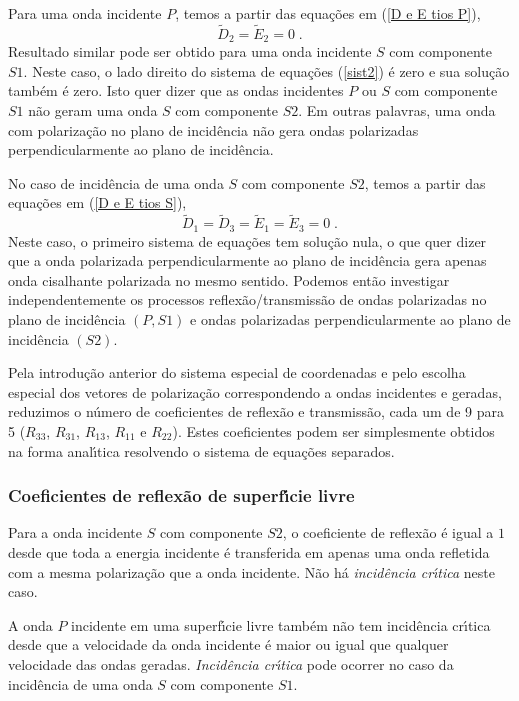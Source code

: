 Para uma onda incidente $P$, temos a partir das equa\c{c}\~oes em
(\ref{D e E tios P}),
\begin{equation}
\tilde{D}_2=\tilde{E}_2=0 \;.
\end{equation}
Resultado similar pode ser obtido para uma onda incidente $S$ com
componente $S1$. Neste caso, o lado direito do sistema de
equa\c{c}\~oes (\ref{sist2}) \'e zero e sua solu\c{c}\~ao tamb\'em
\'e zero. Isto quer dizer que as ondas incidentes $P$ ou $S$ com
componente $S1$ n\~ao geram uma onda $S$ com componente $S2$. Em
outras palavras, uma onda com polariza\c{c}\~ao no plano de
incid\^encia n\~ao gera ondas polarizadas perpendicularmente ao
plano de incid\^encia.

No caso de incid\^encia de uma onda $S$ com componente $S2$, temos
a partir das equa\c{c}\~oes em (\ref{D e E tios S}),
\begin{equation}
\tilde{D}_1=\tilde{D}_3=\tilde{E}_1=\tilde{E}_3=0 \;.
\end{equation}
Neste caso, o primeiro sistema de equa\c{c}\~oes tem solu\c{c}\~ao
nula, o que quer dizer que a onda polarizada perpendicularmente ao
plano de incid\^encia gera apenas onda cisalhante polarizada no
mesmo sentido. Podemos ent\~ao investigar independentemente os
processos reflex\~ao/transmiss\~ao de ondas polarizadas no plano
de incid\^encia $(P,S1)$ e ondas polarizadas perpendicularmente ao
plano de incid\^encia $(S2)$.

Pela introdu\c{c}\~ao anterior do sistema especial de coordenadas
e pelo escolha especial dos vetores de polariza\c{c}\~ao
correspondendo a ondas incidentes e geradas, reduzimos o n\'umero
de coeficientes de reflex\~ao e transmiss\~ao, cada um de 9 para 5
($R_{33}$, $R_{31}$, $R_{13}$, $R_{11}$ e $R_{22}$). Estes
coeficientes podem ser simplesmente obtidos na forma
anal\'{\i}tica resolvendo o sistema de equa\c{c}\~oes separados.


\subsubsection{Coeficientes de reflex\~ao de superf\'{\i}cie livre}

Para a onda incidente $S$ com componente $S2$, o coeficiente de
reflex\~ao \'e igual a $1$ desde que toda a energia incidente \'e
transferida em apenas uma onda refletida com a mesma
polariza\c{c}\~ao que a onda incidente. N\~ao h\'a {\it
incid\^encia cr\'{\i}tica} neste caso.

A onda $P$ incidente em uma superf\'{\i}cie livre tamb\'em n\~ao
tem incid\^encia cr\'{\i}tica desde que a velocidade da onda
incidente \'e maior ou igual que qualquer velocidade das ondas
geradas. {\it Incid\^encia cr\'{\i}tica} pode ocorrer no caso da
incid\^encia de uma onda $S$ com componente $S1$.

